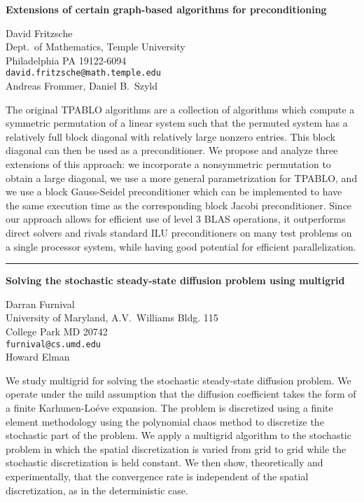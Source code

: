 \documentclass[twosided]{report}
\begin{document}
\begin{center}
{\large			%
{\bf Extensions of certain graph-based algorithms for preconditioning}}

	David Fritzsche \\
	Dept.~of Mathematics, Temple University \\
	Philadelphia PA 19122-6094 \\
	{\tt david.fritzsche@math.temple.edu} \\
	Andreas Frommer, Daniel B.~Szyld
\end{center}
The original TPABLO algorithms are a collection of algorithms
which compute a symmetric permutation of a linear system such
that the permuted system has a relatively full block
diagonal with relatively large nonzero entries. This block
diagonal can then be used as a preconditioner.
We propose and analyze three extensions of this approach: we
incorporate a nonsymmetric
permutation to obtain a large diagonal, we use a more general
parametrization for TPABLO, and we
use a block Gauss-Seidel preconditioner which can be implemented
to have the same execution time
as the corresponding block Jacobi preconditioner. Since our
approach allows for efficient use of level 3
BLAS operations, it outperforms direct solvers and rivals
standard ILU preconditioners on many test
problems on a single processor system, while having good
potential for efficient parallelization.


	\begin{center} \rule{6in}{1pt} \end{center}

\begin{center}
{\large			%
{\bf Solving the stochastic steady-state diffusion problem using multigrid}}

	Darran Furnival \\
	University of Maryland, A.V.~Williams Bldg. 115 \\
	College Park MD 20742 \\
	{\tt furnival@cs.umd.edu} \\
	Howard Elman
\end{center}
We study multigrid for solving the stochastic steady-state
diffusion problem. We operate under the mild assumption that
the diffusion coefficient takes the form of a finite
Karhunen-Lo\'eve expansion. The problem is discretized using
a finite element methodology using the polynomial chaos
method to discretize the stochastic part of the problem. We
apply a multigrid algorithm to the stochastic problem in
which the spatial discretization is varied from grid to grid
while the stochastic discretization is held constant. We
then show, theoretically and experimentally, that the
convergence rate is independent of the spatial
discretization, as in the deterministic case.
\end{document}
